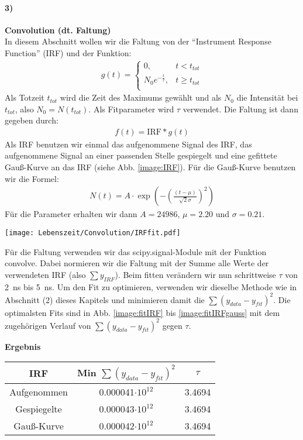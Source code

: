 \paragraph{3)}\textbf{Convolution (dt. Faltung)}\\
In diesem Abschnitt wollen wir die Faltung von der \enquote{Instrument Response Function} (IRF) und der Funktion:
\begin{gather}
    g(t) = 
    \begin{cases}
        0, & t < t_{tot} \\
        N_0 e^{-\frac{t}{\tau}}, & t \geq t_{tot} \\
    \end{cases}
\end{gather}
Als Totzeit $t_{tot}$ wird die Zeit des Maximums gewählt und als $N_0$ die Intensität bei $t_{tot}$, also $N_0 = N(t_{tot})$. Als Fitparameter wird $\tau$ verwendet. Die Faltung ist dann gegeben durch:
\begin{gather}
    f(t) = \text{IRF} * g(t)
\end{gather}
Als IRF benutzen wir einmal das aufgenommene Signal des IRF, das aufgenommene Signal an einer passenden Stelle gespiegelt und eine gefittete Gauß-Kurve an das IRF (siehe Abb. \ref{image:IRF}). Für die Gauß-Kurve benutzen wir die Formel:
\begin{gather}
    N(t) = A \cdot\exp(-\left(\frac{(t-\mu)}{\sqrt{2}\sigma}\right)^2)
\end{gather}
Für die Parameter erhalten wir dann $A = 24986$, $\mu = 2.20$ und $\sigma = 0.21$.
\begin{center}
    \texttt{[image: Lebenszeit/Convolution/IRFfit.pdf]}
    \label{image:IRF}
\end{center}
\newpage
Für die Faltung verwenden wir das scipy.signal-Module mit der Funktion convolve. Dabei normieren wir die Faltung mit der Summe alle Werte der verwendeten IRF (also $\sum y_{IRF}$). Beim fitten verändern wir nun schrittweise $\tau$ von \SI{2}{\nano\second} bis \SI{5}{\nano\second}. Um den Fit zu optimieren, verwenden wir dieselbe Methode wie in Abschnitt (2) dieses Kapitels und minimieren damit die $\sum(y_{data}-y_{fit})^2$. Die optimalsten Fits sind in Abb. \ref{image:fitIRF} bis \ref{image:fitIRFgauss} mit dem zugehörigen Verlauf von $\sum(y_{data}-y_{fit})^2$ gegen $\tau$.
\begin{center}
    \textbf{Ergebnis}\\[0,2cm]
    \begin{tabular}{c | c c}
        IRF & Min $\sum(y_{data}-y_{fit})^2$ & $\tau$ \\
        \hline
        Aufgenommen & 0.000041$\cdot10^{12}$ & 3.4694 \\
        Gespiegelte & 0.000043$\cdot10^{12}$ & 3.4694 \\
        Gauß-Kurve  & 0.000042$\cdot10^{12}$ & 3.4694 \\
    \end{tabular}
\end{center}
